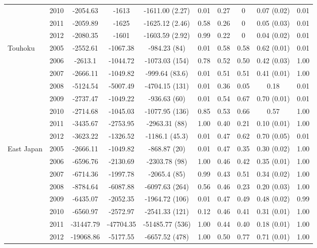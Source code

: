\documentclass[a4paper,twoside]{article}
\begin{document}
\begin{table}[t!]
\begin{center}
\begin{tabular}{|ll||c|c|c|c||c|c|c|c|}
    & 2010 & -2054.63&-1613 &-1611.00 (2.27) & 0.01 & 0.27 & 0 & 0.07 (0.02) & 0.01 \\
    & 2011 &-2059.89 &-1625 &-1625.12 (2.46) & 0.58 & 0.26 & 0 & 0.05 (0.03) & 0.01 \\
    & 2012 &-2080.35 &-1601 &-1603.59 (2.92) & 0.99 & 0.22 & 0 & 0.04 (0.02) & 0.01 \\
    \hline
    Touhoku & 2005 &-2552.61 &-1067.38 &-984.23 (84) & 0.01 & 0.58 & 0.58 & 0.62 (0.01) & 0.01 \\
    & 2006 &-2613.1 &-1044.72 &-1073.03 (154) & 0.78 & 0.52 & 0.50 & 0.42 (0.03) & 1.00\\
    & 2007 & -2666.11&-1049.82 &-999.64 (83.6) & 0.01 & 0.51 & 0.51 & 0.41 (0.01) & 1.00\\
    & 2008 & -5124.54&-5007.49 &-4704.15 (131) & 0.01 & 0.36 & 0.05 & 0.18 & 0.01\\
    & 2009 & -2737.47&-1049.22 &-936.63 (60) & 0.01 & 0.54 & 0.67 & 0.70 (0.01) & 0.01\\
    & 2010 & -2714.68&-1045.03 &-1077.95 (136) & 0.85 & 0.53 & 0.66 & 0.57 & 1.00\\
    & 2011 & -3435.67&-2753.95 &-2963.31 (88) & 1.00 & 0.40 & 0.21 & 0.10 (0.01) & 1.00\\
    & 2012 &-3623.22 &-1326.52 &-1186.1 (45.3) & 0.01 & 0.47 & 0.62 & 0.70 (0.05) & 0.01\\
    \hline
    East Japan & 2005 & -2666.11  &-1049.82 &-868.87 (20) & 0.01 & 0.47 & 0.35 & 0.30 (0.02) & 1.00 \\
    & 2006 & -6596.76 & -2130.69  &-2303.78 (98) & 1.00 & 0.46 & 0.42 & 0.35 (0.01) & 1.00 \\
    & 2007 & -6714.36 & -1997.78  &-2065.4 (85) & 0.99 & 0.43 & 0.51 & 0.34 (0.02) & 1.00 \\
    & 2008 &-8784.64  & -6087.88  &-6097.63 (264) & 0.56 & 0.46 & 0.23 & 0.20 (0.03) & 1.00 \\
    & 2009 & -6435.07 & -2052.35  &-1964.72 (106) & 0.01 & 0.47 & 0.49 & 0.48 (0.02) & 0.99\\
    & 2010 &-6560.97  & -2572.97  &-2541.33 (121) & 0.12 & 0.46 & 0.41 & 0.31 (0.01) & 1.00 \\
    & 2011 & -31447.79& -47704.35 &-51485.77 (536) & 1.00 & 0.44 & 0.40 & 0.18 (0.01) & 1.00 \\
    & 2012 & -19068.86& -5177.55  &-6657.52 (478) & 1.00 & 0.50 & 0.77 & 0.71 (0.01) & 1.00 \\
    \hline
  \end{tabular}
  \end{center}
\end{table}
\end{document}
